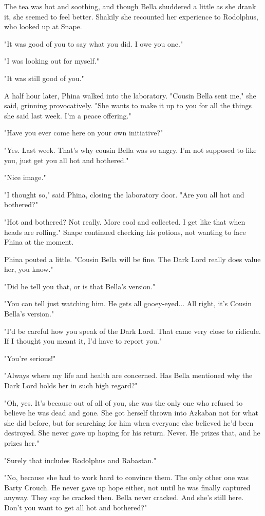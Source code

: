 \documentclass[a4paper,11pt]{article}
\begin{document}
The tea was hot and soothing, and though Bella shuddered a little as she drank it, she seemed to feel better. Shakily she recounted her experience to Rodolphus, who looked up at Snape.

"It was good of you to say what you did. I owe you one."

"I was looking out for myself."

"It was still good of you."

A half hour later, Phina walked into the laboratory. "Cousin Bella sent me," she said, grinning provocatively. "She wants to make it up to you for all the things she said last week. I'm a peace offering."

"Have you ever come here on your own initiative?"

"Yes. Last week. That's why cousin Bella was so angry. I'm not supposed to like you, just get you all hot and bothered."

"Nice image."

"I thought so," said Phina, closing the laboratory door. "Are you all hot and bothered?"

"Hot and bothered? Not really. More cool and collected. I get like that when heads are rolling." Snape continued checking his potions, not wanting to face Phina at the moment.

Phina pouted a little. "Cousin Bella will be fine. The Dark Lord really does value her, you know."

"Did he tell you that, or is that Bella's version."

"You can tell just watching him. He gets all gooey-eyed... All right, it's Cousin Bella's version."

"I'd be careful how you speak of the Dark Lord. That came very close to ridicule. If I thought you meant it, I'd have to report you."

"You're serious!"

"Always where my life and health are concerned. Has Bella mentioned why the Dark Lord holds her in such high regard?"

"Oh, yes. It's because out of all of you, she was the only one who refused to believe he was dead and gone. She got herself thrown into Azkaban not for what she did before, but for searching for him when everyone else believed he'd been destroyed. She never gave up hoping for his return. Never. He prizes that, and he prizes her."

"Surely that includes Rodolphus and Rabastan."

"No, because she had to work hard to convince them. The only other one was Barty Crouch. He never gave up hope either, not until he was finally captured anyway. They say he cracked then. Bella never cracked. And she's still here. Don't you want to get all hot and bothered?"
\end{document}
